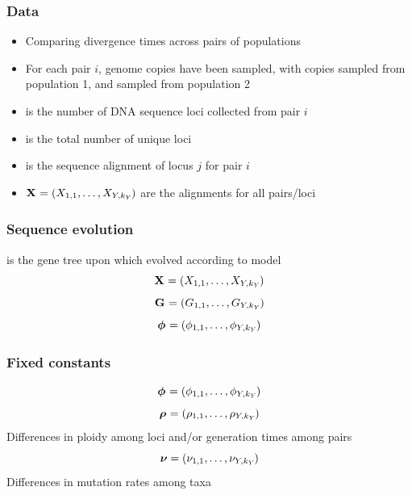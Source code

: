 \begin{frame}
    \frametitle{Data}
    \begin{itemize}
        \item Comparing divergence times across \npairs{} pairs of populations
        \item For each pair $i$,  genome copies have been
            sampled, with  copies sampled from population
            1, and  sampled from population 2
        \item {} is the number of DNA sequence loci collected from
            pair $i$
        \item \nlociTotal is the total number of unique loci
        \item {} is the sequence alignment of
            locus $j$ for pair $i$
        \item $\alignmentVector = (\alignment{1}{1}, \ldots,
            \alignment{\npairs{}}{\nloci{\npairs{}}})$
            are the alignments for all pairs/loci
    \end{itemize}
\end{frame}

\begin{frame}
    \frametitle{Sequence evolution}
     is the gene tree upon which 
            evolved according to \hky model 
    \[
        \alignmentVector = (\alignment{1}{1}, \ldots,
            \alignment{\npairs{}}{\nloci{\npairs{}}})
    \]
    \[
        \geneTreeVector = (\geneTree{1}{1}, \ldots,
        \geneTree{\npairs{}}{\nloci{\npairs{}}})
    \]
    \[
        \hkyModelVector = (\hkyModel{1}{1}, \ldots,
        \hkyModel{\npairs{}}{\nloci{\npairs{}}})
    \]
\end{frame}

\begin{frame}
    \frametitle{Fixed constants}
    \[
        \hkyModelVector = (\hkyModel{1}{1}, \ldots,
        \hkyModel{\npairs{}}{\nloci{\npairs{}}})
    \]
    \[
        \ploidyScalarVector = (\ploidyScalar{1}{1}, \ldots,
        \ploidyScalar{\npairs{}}{\nloci{\npairs{}}})
    \]
    Differences in ploidy among loci and/or generation times among
    pairs
    \[
        \mutationRateScalarConstantVector = (\mutationRateScalarConstant{1}{1},
        \ldots, \mutationRateScalarConstant{\npairs{}}{\nloci{\npairs{}}})
    \]
    Differences in mutation rates among taxa
\end{frame}

